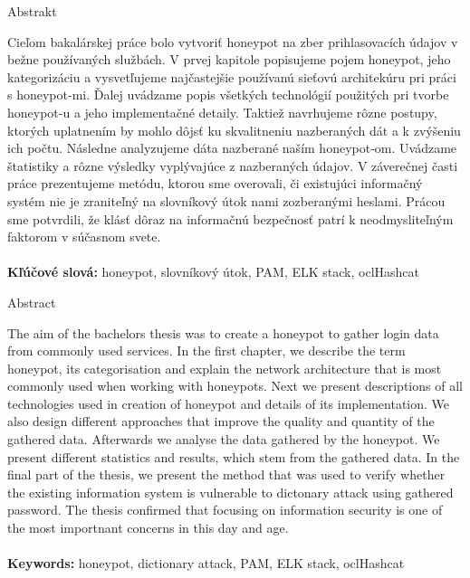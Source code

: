 \documentclass[12pt, oneside]{book}
\begin{document}

\newpage 
\thispagestyle{empty}

\huge{Abstrakt}
\normalsize
\newline

Cieľom bakalárskej práce bolo vytvoriť honeypot na zber prihlasovacích údajov v bežne používaných službách.
V prvej kapitole popisujeme pojem honeypot, jeho kategorizáciu a vysvetľujeme najčastejšie používanú sieťovú architekúru pri práci s honeypot-mi.
Ďalej uvádzame popis všetkých technológií použitých pri tvorbe honeypot-u a jeho implementačné detaily.
Taktiež navrhujeme rôzne postupy, ktorých uplatnením by mohlo dôjsť ku skvalitneniu nazberaných dát a k zvýšeniu ich počtu.
Následne analyzujeme dáta nazberané naším honeypot-om.
Uvádzame štatistiky a rôzne výsledky vyplývajúce z nazberaných údajov.
V zá\-ve\-reč\-nej časti práce prezentujeme metódu, ktorou sme overovali, či existujúci informačný systém nie je zraniteľný na slovníkový útok nami zozberanými heslami.
Prácou sme potvrdili, že klásť dôraz na informačnú bezpečnosť patrí k neodmysliteľným faktorom v súčasnom svete.
\\
\\
{\bf Kľúčové slová:} honeypot, slovníkový útok, PAM, ELK stack, \mbox{oclHashcat}


\newpage 
\thispagestyle{empty}

\huge{Abstract}
\normalsize
\newline

The aim of the bachelors thesis was to create a honeypot to gather login data from commonly used services.
In the first chapter, we describe the term honeypot, its categorisation and explain the network architecture that is most commonly used when working with honeypots.
Next we present descriptions of all technologies used in creation of honeypot and details of its implementation.
We also design different approaches that improve the quality and quantity of the gathered data.
Afterwards we analyse the data gathered by the honeypot.
We present different statistics and results, which stem from the gathered data.
In the final part of the thesis, we present the method that was used to verify whether the existing information system is vulnerable to dictonary attack using gathered password.
The thesis confirmed that focusing on information security is one of the most importnant concerns in this day and age.
\\
\\
{\bf Keywords:} honeypot, dictionary attack, PAM, ELK stack, oclHashcat
\end{document}
